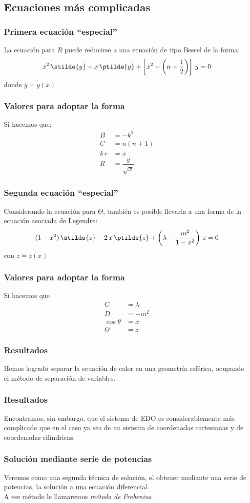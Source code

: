 \subsection{Ecuaciones más complicadas}
\begin{frame}
\frametitle{Primera ecuación \enquote{especial}}
La ecuación para $R$ puede reducirse a una ecuación de tipo Bessel de la forma:
\begin{align}
x^{2} \, \stilde{y} + x \, \ptilde{y} + \left[ x^{2} - \left( n + \dfrac{1}{2} \right) \right] \, y = 0
\label{eq:ecuacion_02_304}
\end{align}
donde $y = y(x)$
\end{frame}
\begin{frame}
\frametitle{Valores para adoptar la forma}
Si hacemos que:
\begin{align*}
B &= -k^{2} \\[0.5em]
C &= n(n + 1) \\[0.5em]
k \, r &= x \\[0.5em]
R &= \dfrac{y}{\sqrt{x}}
\end{align*}
\end{frame}
\begin{frame}
\frametitle{Segunda ecuación \enquote{especial}}
Considerando la ecuación para $\Theta$, también es posible llevarla a una forma de la ecuación asociada de Legendre:
\begin{align*}
(1 - x^{2}) \, \stilde{z} - 2 \, x \, \ptilde{z} + \left( \lambda - \dfrac{m^{2}}{1 -x^{2}} \right) \, z = 0
\label{eq:ecuacion_02_305}
\end{align*}
con $z = z(x)$
\end{frame}
\begin{frame}
\frametitle{Valores para adoptar la forma}
Si hacemos que
\begin{align*}
C &= \lambda \\[0.5em]
D &= - m^{2} \\[0.5em]
\cos \theta &= x \\[0.5em]
\Theta &= z
\end{align*}
\end{frame}
\begin{frame}
\frametitle{Resultados}
Hemos logrado separar la ecuación de calor en una geometría esférica, ocupando el método de separación de variables.
\end{frame}
\begin{frame}
\frametitle{Resultados}
Encontramos, sin embargo, que el sistema de EDO es considerablemente más complicado que en el caso ya sea de un sistema de coordenadas cartesianas y de  coordenadas cilíndricas.
\end{frame}
\begin{frame}
\frametitle{Solución mediante serie de potencias}
Veremos como una segunda técnica de solución, el obtener mediante una serie de potencias, la solución a una ecuación diferencial.
\\
\bigskip
\pause
A ese método le llamaremos \emph{método de Frobenius}.
\end{frame}
